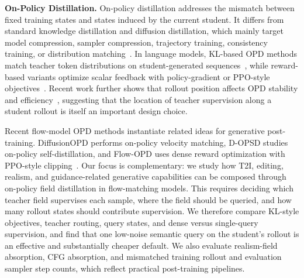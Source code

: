 \documentclass{llmxive}
\begin{document}
\noindent\textbf{On-Policy Distillation.}
On-policy distillation addresses the mismatch between fixed training states and states induced by the current student. It differs from standard knowledge distillation and diffusion distillation, which mainly target model compression, sampler compression, trajectory training, consistency training, or distribution matching~\cite{hinton2015distilling,salimans2022progressive,song2023consistency,luo2023latent,yin2024one,sauer2024fast,kim2024consistency}. In language models, KL-based OPD methods match teacher token distributions on student-generated sequences~\cite{gu2024minillm,agarwal2024policy,jia2026asymmetric}, while reward-based variants optimize scalar feedback with policy-gradient or PPO-style objectives~\cite{yang2026learning,luo2026demystifying,fang2026rubric}. Recent work further shows that rollout position affects OPD stability and efficiency~\cite{ziheng2026moreearlystoppingrollout,kong2026ai}, suggesting that the location of teacher supervision along a student rollout is itself an important design choice.

Recent flow-model OPD methods instantiate related ideas for generative post-training. DiffusionOPD performs on-policy velocity matching, D-OPSD studies on-policy self-distillation, and Flow-OPD uses dense reward optimization with PPO-style clipping~\cite{li2026diffusionopd,jiang2026d,fang2026flow}. Our focus is complementary: we study how T2I, editing, realism, and guidance-related generative capabilities can be composed through on-policy field distillation in flow-matching models. This requires deciding which teacher field supervises each sample, where the field should be queried, and how many rollout states should contribute supervision. We therefore compare KL-style objectives, teacher routing, query states, and dense versus single-query supervision, and find that one low-noise semantic query on the student's rollout is an effective and substantially cheaper default. We also evaluate realism-field absorption, CFG absorption, and mismatched training rollout and evaluation sampler step counts, which reflect practical post-training pipelines.
\end{document}

